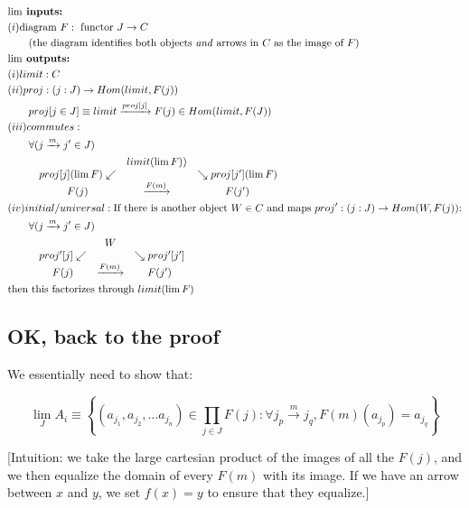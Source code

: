 \documentclass{book}
\theoremstyle{definition}
\begin{document}
\begin{align*}
&\textbf{$\lim$ inputs:}\\
    &(i) \text{diagram} ~ F: \text{ functor } J \rightarrow C \\
    &\qquad \text{(the diagram identifies both objects \emph{and} arrows in $C$ as the image of $F$)}  \\
&\textbf{$\lim$ outputs:} \\
&(i) limit: C \\
    &(ii) proj: (j: J) \rightarrow Hom(limit, F(j)) \\ &\qquad proj[j \in J] \equiv limit \xrightarrow{proj[j]} F(j) \in Hom(limit, F(J)) \\
&(iii) commutes: \\
&\qquad \forall (j \xrightarrow{m} j' \in J) \\
&\qquad 
\begin{matrix}
    & &limit(\lim F)) & \\
    &proj[j](\lim F) \swarrow & & \searrow proj[j'](\lim F) \\
&F(j) & \xrightarrow{F(m)} & F(j') \\
\end{matrix} \\
    &(iv) initial/universal: \text{If there is another object $W \in C$ and maps $proj': (j: J) \rightarrow Hom(W, F(j))$:} \\
&\qquad \forall (j \xrightarrow{m} j' \in J) \\
&\qquad
\begin{matrix}
    & & W & \\
&proj'[j] \swarrow & & \searrow proj'[j'] \\
&F(j) & \xrightarrow{F(m)} & F(j') \\
\end{matrix} \\
    &\text{then this factorizes through $limit(\lim F)$} 
\end{align*}


\subsection{OK, back to the proof}

We essentially need to show that:

$$
\lim_J A_i \equiv \left\{ (a_{j_1}, a_{j_2}, \dots a_{j_n}) \in \prod_{j \in J}  F(j) : \forall j_p \xrightarrow{m} j_q, F(m)(a_{j_p}) = a_{j_q}
 \right\}
$$

[Intuition: we take the large cartesian product of the images of all the $F(j)$, and 
we then equalize the domain of every $F(m)$ with its image. If we have an arrow between $x$ and $y$, we set $f(x) = y$
to ensure that they equalize.]
\end{document}
